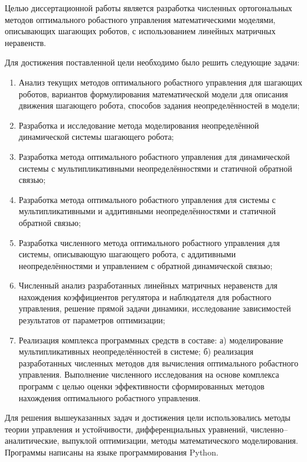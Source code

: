 {\aimtasks} 

Целью диссертационной работы является разработка численных ортогональных методов оптимального робастного управления математическими моделями, описывающих шагающих роботов, с использованием линейных матричных неравенств.

Для достижения поставленной цели необходимо было решить следующие задачи:
\begin{enumerate}[beginpenalty=10000] %
	\item Анализ текущих методов оптимального робастного управления для шагающих роботов, вариантов формулирования математической модели для описания движения шагающего робота, способов задания неопределённостей в модели;
	\item Разработка и исследование метода моделирования неопределённой динамической системы шагающего робота; 
	\item Разработка метода оптимального робастного управления для динамической системы с мультипликативными неопределённостями и статичной обратной связью;
	\item Разработка метода оптимального робастного управления для системы с мультипликативными и аддитивными неопределённостями и статичной обратной связью;
	\item Разработка численного метода оптимального робастного управления для системы, описывающую шагающего робота, с аддитивными неопределённостями и управлением с обратной динамической связью;
	\item Численный анализ разработанных линейных матричных неравенств для нахождения коэффициентов регулятора и наблюдателя для робастного управления, решение прямой задачи динамики, исследование зависимостей результатов от параметров оптимизации;
	\item Реализация комплекса программных средств в составе: а) моделирование мультипликативных неопределённостей в системе; б) реализация разработанных численных методов для вычисления оптимального робастного управления. Выполнение численного исследования на основе комплекса программ с целью оценки эффективности сформированных методов нахождения оптимального робастного управления.
\end{enumerate}

{\methods} 

Для решения вышеуказанных задач и достижения цели использовались методы теории управления и устойчивости, дифференциальных уравнений, численно--аналитические, выпуклой оптимизации, методы математического моделирования. Программы написаны на языке программирования Python.

